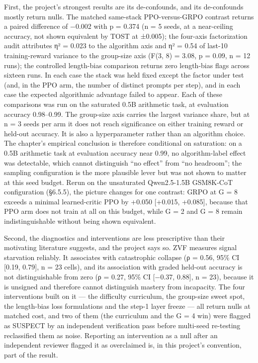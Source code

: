 \documentclass[12pt,a4paper]{report}
\begin{document}
First, the project's strongest results are its de-confounds, and its
de-confounds mostly return nulls. The matched same-stack PPO-versus-GRPO
contrast returns a paired difference of −0.002 with p = 0.374 (n = 5
seeds, at a near-ceiling accuracy, not shown equivalent by TOST at
±0.005); the four-axis factorization audit attributes η² = 0.023 to the
algorithm axis and η² = 0.54 of last-10 training-reward variance to the
group-size axis (F(3, 8) = 3.08, p = 0.09, n = 12 runs); the controlled
length-bias comparison returns zero length-bias flags across sixteen
runs. In each case the stack was held fixed except the factor under test
(and, in the PPO arm, the number of distinct prompts per step), and in
each case the expected algorithmic advantage failed to appear. Each of
these comparisons was run on the saturated 0.5B arithmetic task, at
evaluation accuracy 0.98--0.99. The group-size axis carries the largest
variance share, but at n = 3 seeds per arm it does not reach
significance on either training reward or held-out accuracy. It is also
a hyperparameter rather than an algorithm choice. The chapter's
empirical conclusion is therefore conditional on saturation: on a 0.5B
arithmetic task at evaluation accuracy near 0.99, no algorithm-label
effect was detectable, which cannot distinguish ``no effect'' from ``no
headroom''; the sampling configuration is the more plausible lever but
was not shown to matter at this seed budget. Rerun on the unsaturated
Qwen2.5-1.5B GSM8K-CoT configuration (§6.5.5), the picture changes for
one contrast: GRPO at G = 8 exceeds a minimal learned-critic PPO by
+0.050 {[}+0.015, +0.085{]}, because that PPO arm does not train at all
on this budget, while G = 2 and G = 8 remain indistinguishable without
being shown equivalent.

Second, the diagnostics and interventions are less prescriptive than
their motivating literature suggests, and the project says so. ZVF
measures signal starvation reliably. It associates with catastrophic
collapse (ρ = 0.56, 95\% CI {[}0.19, 0.79{]}, n = 23 cells), and its
association with graded held-out accuracy is not distinguishable from
zero (ρ = 0.27, 95\% CI {[}−0.37, 0.88{]}, n = 23), because it is
unsigned and therefore cannot distinguish mastery from incapacity. The
four interventions built on it --- the difficulty curriculum, the
group-size sweet spot, the length-bias loss formulations and the step-1
layer freeze --- all return nulls at matched cost, and two of them (the
curriculum and the G = 4 win) were flagged as SUSPECT by an independent
verification pass before multi-seed re-testing reclassified them as
noise. Reporting an intervention as a null after an independent reviewer
flagged it as overclaimed is, in this project's convention, part of the
result.
\end{document}
